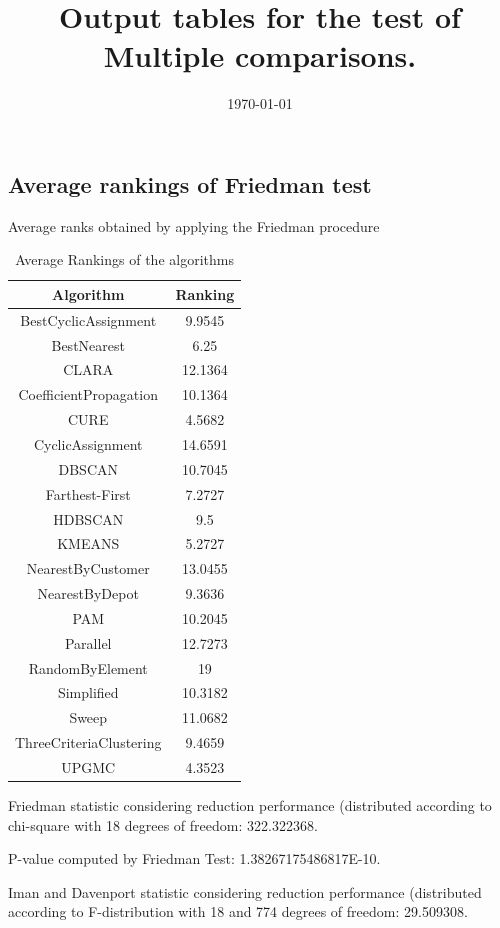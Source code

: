 \documentclass[a4paper,10pt]{article}
\title{Output tables for the test of Multiple comparisons.}
\author{}
\date{\today}
\begin{document}
\begin{landscape}
\pagestyle{empty}
\maketitle
\thispagestyle{empty}
\section{Average rankings of Friedman test}



Average ranks obtained by applying the Friedman procedure

\begin{table}[!htp]
\centering
\begin{tabular}{|c|c|}\hline
Algorithm&Ranking\\\hline
BestCyclicAssignment & 9.9545\\
BestNearest & 6.25\\
CLARA & 12.1364\\
CoefficientPropagation & 10.1364\\
CURE & 4.5682\\
CyclicAssignment & 14.6591\\
DBSCAN & 10.7045\\
Farthest-First & 7.2727\\
HDBSCAN & 9.5\\
KMEANS & 5.2727\\
NearestByCustomer & 13.0455\\
NearestByDepot & 9.3636\\
PAM & 10.2045\\
Parallel & 12.7273\\
RandomByElement & 19\\
Simplified & 10.3182\\
Sweep & 11.0682\\
ThreeCriteriaClustering & 9.4659\\
UPGMC & 4.3523\\
\hline
\end{tabular}
\caption{Average Rankings of the algorithms}
\end{table}

Friedman statistic considering reduction performance (distributed according to chi-square with 18 degrees of freedom: 322.322368.

P-value computed by Friedman Test: 1.38267175486817E-10.\newline

Iman and Davenport statistic considering reduction performance (distributed according to F-distribution with 18 and 774 degrees of freedom: 29.509308.


\end{landscape}
\end{document}
